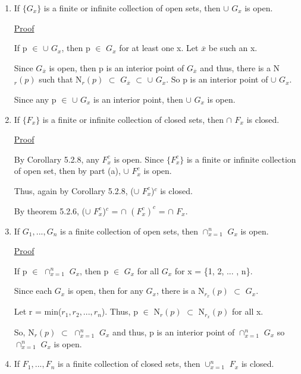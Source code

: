 	\begin{enumerate}[label=(\alph*), leftmargin=2cm, itemsep=0.4em]
		\item If $\{G_x\}$ is a finite or infinite collection of open sets,
		then $\cup$ $G_x$ is open.

			{ \color{magenta} \underline{Proof} }

				If p $\in$ $\cup$ $G_x$, then p $\in$ $G_x$ for at least one x.
				Let $\overline{x}$ be such an x.

				Since $G_{\overline{x}}$ is open, then p is an interior point of
				$G_{\overline{x}}$ and thus, there is a N$_r(p)$ such that
				N$_r(p)$ $\subset$ $G_{\overline{x}}$ $\subset$ $\cup$ $G_x$.
				So p is an interior point of $\cup$ $G_x$.

				Since any p $\in$ $\cup$ $G_x$ is an interior point, then
				$\cup$ $G_x$ is open.

		\item If $\{F_x\}$ is a finite or infinite collection of closed sets,
		then $\cap$ $F_x$ is closed.

			{ \color{magenta} \underline{Proof} }

				By {\color{orange} Corollary 5.2.8}, any $F_x^c$ is open.
				Since $\{F_x^c\}$ is a finite or infinite collection of
				open set, then by part (a), $\cup$ $F_x^c$ is open.

				Thus, again by {\color{orange} Corollary 5.2.8},
				($\cup$ $F_x^c$)$^c$ is closed.

				By {\color{red} theorem 5.2.6},
				($\cup$ $F_x^c$)$^c$ = $\cap$ $(F_x^c)^c$
				= $\cap$ $F_x$.
				
		\item If $G_1, ... , G_n$ is a finite collection of open sets,
		then $\cap_{x=1}^n$ $G_x$ is open.

			{ \color{magenta} \underline{Proof} }

				If p $\in$ $\cap_{x=1}^n$ $G_x$, then p $\in$ $G_x$ for
				all $G_x$ for x = \{1, 2, ... , n\}.

				Since each $G_x$ is open, then for any $G_x$, there is a
				N$_{r_x}(p)$ $\subset$ $G_x$.

				Let r = min($r_1, r_2 , ... , r_n$).
				Thus, p $\in$ N$_r(p)$ $\subset$ N$_{r_x}(p)$ for all x.

				So, N$_r(p)$ $\subset$ $\cap_{x=1}^n$ $G_x$ and thus,
				p is an interior point of $\cap_{x=1}^n$ $G_x$ so
			    $\cap_{x=1}^n$ $G_x$ is open.

		\item If $F_1, ... , F_n$ is a finite collection of closed sets,
		then $\cup_{x=1}^n$ $F_x$ is closed.


\end{enumerate}
